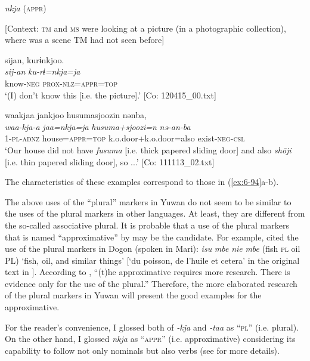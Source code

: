 \begin{table}
\ea\label{ex:6-98}
  \textit{nkja} (\textsc{appr})

  [Context: \textsc{tm} and \textsc{ms} were looking at a picture (in a photographic collection), where was a scene TM had not seen before]

 \ea {\TM}  sijan,  kurɨnkjoo.\\
\glll \textit{sij-an}  \textit{ku-rɨ=nkja=ja}\\
know-\textsc{neg}  \textsc{prox}-\textsc{nlz}=\textsc{appr}=\textsc{top}\\
\glt ‘(I) don’t know this [i.e. the picture].’ [Co: 120415\_00.txt]
\z

\ex {\TM}  waakjaa  jankjoo  {\textbar}husumasjoozi{\textbar}n  nənba,\\
\glll \textit{waa-kja-a}  \textit{jaa=nkja=ja}  \textit{husuma+sjoozi=n}  \textit{nə-an-ba}\\
1-\textsc{pl}-\textsc{adnz}  house=\textsc{appr}=\textsc{top}  k.o.door+k.o.door=also  exist-\textsc{neg}-\textsc{csl}\\
\glt ‘Our house did not have \textit{fusuma} [i.e. thick papered sliding door] and also \textit{shōji} [i.e. thin papered sliding door], so ...’ [Co: 111113\_02.txt]
\z

The characteristics of these examples correspond to those in (\ref{ex:6-94}a-b).

  The above uses of the “plural” markers in Yuwan do not seem to be similar to the uses of the plural markers in other languages. At least, they are different from the so-called associative plural. It is probable that a use of the plural markers that is named “approximative” by \citet[239-240]{Corbett2000} may be the candidate. For example, \citet[239]{Corbett2000} cited the use of the plural markers in Dogon (spoken in Mari): \textit{isu} \textit{mbe} \textit{nie} \textit{mbe} (fish \textsc{pl} oil PL) ‘fish, oil, and similar things’ [‘du poisson, de l’huile et cetera’ in the original text in \citet[11]{Plungian1995}]. According to \citet[240]{Corbett2000}, “(t)he approximative requires more research. There is evidence only for the use of the plural.” Therefore, the more elaborated research of the plural markers in Yuwan will present the good examples for the approximative.

  For the reader’s convenience, I glossed both of \textit{-kja} and \textit{-taa} as “\textsc{pl}” (i.e. plural). On the other hand, I glossed \textit{nkja} as “\textsc{appr}” (i.e. approximative) considering its capability to follow not only nominals but also verbs (see  for more details).


\end{table}
